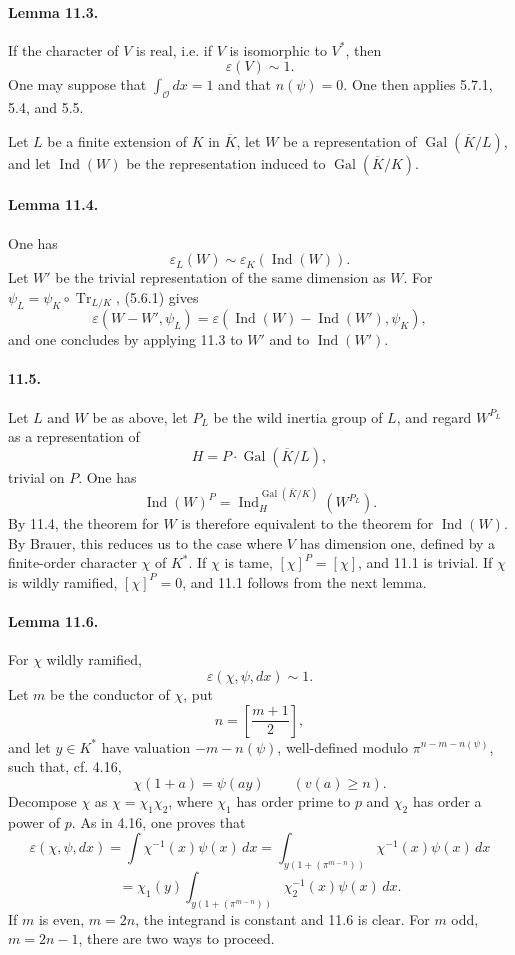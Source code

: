 \documentclass[10pt]{article}
\newcommand{\Gal}{\operatorname{Gal}}
\newcommand{\Ind}{\operatorname{Ind}}
\newcommand{\Tr}{\operatorname{Tr}}
\providecommand{\OO}{\mathcal O}
\providecommand{\OO}{\mathcal O}
\providecommand{\OO}{\mathcal O}
\providecommand{\OO}{\mathcal O}
\providecommand{\Gal}{\operatorname{Gal}}
\providecommand{\OO}{\mathcal O}
\providecommand{\Gal}{\operatorname{Gal}}
\providecommand{\Tr}{\operatorname{Tr}}
\providecommand{\OO}{\mathcal O}
\providecommand{\Gal}{\operatorname{Gal}}
\providecommand{\Tr}{\operatorname{Tr}}
\providecommand{\OO}{\mathcal O}
\providecommand{\Gal}{\operatorname{Gal}}
\providecommand{\Tr}{\operatorname{Tr}}
\providecommand{\Ind}{\operatorname{Ind}}
\begin{document}
\paragraph{Lemma 11.3.} If the character of \(V\) is real, i.e. if \(V\) is isomorphic to \(V^*\), then
\[
\varepsilon(V)\sim1.
\]
One may suppose that \(\int_{\OO}dx=1\) and that \(n(\psi)=0\). One then applies 5.7.1, 5.4, and 5.5.

Let \(L\) be a finite extension of \(K\) in \(\overline K\), let \(W\) be a representation of \(\Gal(\overline K/L)\), and let \(\Ind(W)\) be the representation induced to \(\Gal(\overline K/K)\).

\paragraph{Lemma 11.4.} One has
\[
\varepsilon_L(W)\sim\varepsilon_K(\Ind(W)).
\]
Let \(W'\) be the trivial representation of the same dimension as \(W\). For \(\psi_L=\psi_K\circ\Tr_{L/K}\), (5.6.1) gives
\[
\varepsilon(W-W',\psi_L)=\varepsilon(\Ind(W)-\Ind(W'),\psi_K),
\]
and one concludes by applying 11.3 to \(W'\) and to \(\Ind(W')\).

\paragraph{11.5.} Let \(L\) and \(W\) be as above, let \(P_L\) be the wild inertia group of \(L\), and regard \(W^{P_L}\) as a representation of
\[
H=P\cdot\Gal(\overline K/L),
\]
trivial on \(P\). One has
\[
\Ind(W)^P=\Ind_H^{\Gal(\overline K/K)}(W^{P_L}).
\]
By 11.4, the theorem for \(W\) is therefore equivalent to the theorem for \(\Ind(W)\). By Brauer, this reduces us to the case where \(V\) has dimension one, defined by a finite-order character \(\chi\) of \(K^*\). If \(\chi\) is tame, \([\chi]^P=[\chi]\), and 11.1 is trivial. If \(\chi\) is wildly ramified, \([\chi]^P=0\), and 11.1 follows from the next lemma.

\paragraph{Lemma 11.6.} For \(\chi\) wildly ramified,
\[
\varepsilon(\chi,\psi,dx)\sim1.
\]
Let \(m\) be the conductor of \(\chi\), put
\[
n=\left[\frac{m+1}{2}\right],
\]
and let \(y\in K^*\) have valuation \(-m-n(\psi)\), well-defined modulo \(\pi^{n-m-n(\psi)}\), such that, cf. 4.16,
\[
\chi(1+a)=\psi(ay)\qquad(v(a)\ge n).
\]
Decompose \(\chi\) as \(\chi=\chi_1\chi_2\), where \(\chi_1\) has order prime to \(p\) and \(\chi_2\) has order a power of \(p\). As in 4.16, one proves that
\[
\tag{11.6.1}
\varepsilon(\chi,\psi,dx)
=
\int \chi^{-1}(x)\psi(x)\,dx
=
\int_{y(1+(\pi^{m-n}))}\chi^{-1}(x)\psi(x)\,dx
\]
\[
=
\chi_1(y)
\int_{y(1+(\pi^{m-n}))}\chi_2^{-1}(x)\psi(x)\,dx.
\]
If \(m\) is even, \(m=2n\), the integrand is constant and 11.6 is clear. For \(m\) odd, \(m=2n-1\), there are two ways to proceed.
\end{document}
